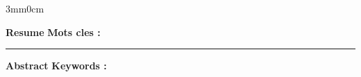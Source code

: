 
\thispagestyle{backcover}

\begin{changemargin}{3mm}{0cm}
    \begin{minipage}[c]{0.96\columnwidth}
        
        {\LARGE\textbf{Resume}}
        \vskip1mm
        \begingroup
            \large
            \@frenchAbstract
        \endgroup
        \vskip1mm
        {\textbf{Mots cles : }
            \begingroup
                \@frenchAbstractKeywords
            \endgroup
        }
        
        \vskip8mm
        \noindent\rule{\linewidth}{0.5pt}
        \vskip8mm
        
        {\LARGE\textbf{Abstract}}
        \vskip1mm
        \begingroup
            \large
            \@englishAbstract
        \endgroup
        \vskip1mm
        {\textbf{Keywords : }
            \begingroup
                \@englishAbstractKeywords
            \endgroup
        }
    \end{minipage}
\end{changemargin}
